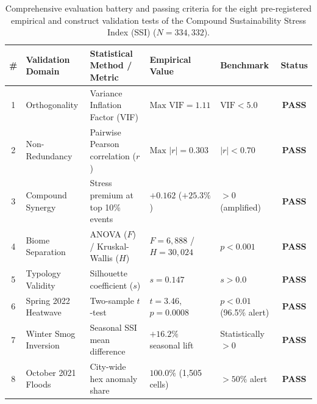 \begin{table}[t]
\centering
\small
\caption{Comprehensive evaluation battery and passing criteria for the eight pre-registered empirical and construct validation tests of the Compound Sustainability Stress Index (SSI) ($N = 334,332$).}
\label{tab:validation_summary}
\begin{tabularx}{\textwidth}{@{}c l X l l c@{}}
\toprule
\textbf{\#} & \textbf{Validation Domain} & \textbf{Statistical Method / Metric} & \textbf{Empirical Value} & \textbf{Benchmark} & \textbf{Status} \\
\midrule
1 & Orthogonality & Variance Inflation Factor (VIF) & $\text{Max VIF} = 1.11$ & $\text{VIF} < 5.0$ & \textbf{PASS} \\
2 & Non-Redundancy & Pairwise Pearson correlation ($r$) & $\text{Max } |r| = 0.303$ & $|r| < 0.70$ & \textbf{PASS} \\
3 & Compound Synergy & Stress premium at top 10\% events & $+0.162$ ($+25.3\%$) & $> 0$ (amplified) & \textbf{PASS} \\
4 & Biome Separation & ANOVA ($F$) / Kruskal-Wallis ($H$) & $F = 6,888$ / $H = 30,024$ & $p < 0.001$ & \textbf{PASS} \\
5 & Typology Validity & Silhouette coefficient ($s$) & $s = 0.147$ & $s > 0.0$ & \textbf{PASS} \\
6 & Spring 2022 Heatwave & Two-sample $t$-test & $t = 3.46$, $p = 0.0008$ & $p < 0.01$ (96.5\% alert) & \textbf{PASS} \\
7 & Winter Smog Inversion & Seasonal SSI mean difference & $+16.2\%$ seasonal lift & Statistically $> 0$ & \textbf{PASS} \\
8 & October 2021 Floods & City-wide hex anomaly share & $100.0\%$ (1,505 cells) & $> 50\%$ alert & \textbf{PASS} \\
\bottomrule
\end{tabularx}
\end{table}
